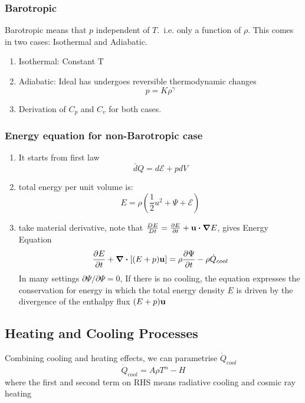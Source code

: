 \documentclass[12pt,a4paper]{article}
\begin{document}
    \subsubsection{Barotropic}
        Barotropic means that $p$ independent of $T$.\ i.e. only a function of $\rho$. This comes in two cases: Isothermal and Adiabatic.
        \begin{enumerate}
            \item Isothermal: Constant T
            \item Adiabatic: Ideal has undergoes reversible thermodynamic changes
            \begin{equation}
                p= K \rho^{\gamma}
            \end{equation} 
            \item Derivation of $C_p$ and $C_v$ for both cases.
        \end{enumerate}
    \subsubsection{Energy equation for non-Barotropic case}
        \begin{enumerate}
            \item It starts from first law
            \begin{equation}
                \bar{d}Q = d \mathcal{E} + pdV
            \end{equation}
            \item total energy per unit volume is:
            \begin{equation}
                E=\rho(\frac{1}{2}u^2 +\Psi + \mathcal{E})
            \end{equation}
            \item take material derivative, note that $\frac{DE}{Dt}=\pdv{E}{t}+\vb{u}\dotproduct\grad{E}$, gives Energy Equation
            \begin{equation}
                \pdv{E}{t}+\div{[(E+p)\vb{u}]= \rho\pdv{\Psi}{t}-\rho \dot{Q}_{cool}}
            \end{equation}
            In many settings $\partial{\Psi}/\partial{\Psi}=0$, If there is no cooling, the equation expresses the conservation for energy in which
            the total energy density $E$ is driven by the divergence of the enthalpy flux $(E+p)\vb{u}$
        \end{enumerate}
    \subsection{Heating and Cooling Processes}
        Combining cooling and heating effects, we can parametrise $\dot{Q}_{cool}$
        \begin{equation}
            \dot{Q}_{cool} = A \rho T^{\alpha} - H
        \end{equation}
        where the first and second term on RHS means radiative cooling and cosmic ray heating
\end{document}
